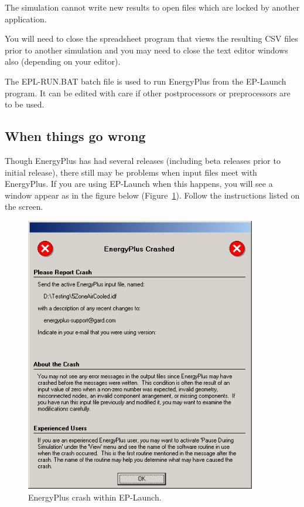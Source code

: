 The simulation cannot write new results to open files which are locked by another application.

You will need to close the spreadsheet program that views the resulting CSV files prior to another simulation and you may need to close the text editor windows also (depending on your editor).

The EPL-RUN.BAT batch file is used to run EnergyPlus from the EP-Launch program. It can be edited with care if other postprocessors or preprocessors are to be used.

\subsection{When things go wrong}\label{when-things-go-wrong}

Though EnergyPlus has had several releases (including beta releases prior to initial release), there still may be problems when input files meet with EnergyPlus. If you are using EP-Launch when this happens, you will see a window appear as in the figure below (Figure~\ref{fig:energyplus-crash-within-ep-launch.}). Follow the instructions listed on the screen.

\begin{figure}[hbtp] %
\centering
\includegraphics[width=0.9\textwidth, height=0.9\textheight, keepaspectratio=true]{media/image114.png}
\caption{EnergyPlus crash within EP-Launch. \protect \label{fig:energyplus-crash-within-ep-launch.}}
\end{figure}

